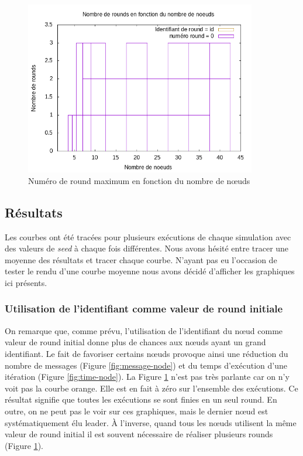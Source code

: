 \documentclass[french]{article}
\begin{document}
\begin{figure}[ht]
	\centering
	\includegraphics[width=0.9\textwidth]{NoeudsRounds.png} %
	\caption{Numéro de round maximum en fonction du nombre de nœuds}
	\label{fig:round-node}
\end{figure}

\subsection{Résultats}

Les courbes ont été tracées pour plusieurs exécutions de chaque simulation avec des valeurs de \emph{seed} à chaque fois différentes.
Nous avons hésité entre tracer une moyenne des résultats et tracer chaque courbe.
N'ayant pas eu l'occasion de tester le rendu d'une courbe moyenne nous avons décidé d'afficher les graphiques ici présents.

\subsubsection{Utilisation de l'identifiant comme valeur de round initiale}

On remarque que, comme prévu, l'utilisation de l'identifiant du nœud comme valeur de round initial donne plus de chances aux nœuds ayant un grand identifiant.
Le fait de favoriser certains nœuds provoque ainsi une réduction du nombre de messages (Figure \ref{fig:message-node}) et du temps d'exécution d'une itération (Figure \ref{fig:time-node}).
La Figure \ref{fig:round-node} n'est pas très parlante car on n'y voit pas la courbe orange. Elle est en fait à zéro sur l'ensemble des exécutions.
Ce résultat signifie que toutes les exécutions se sont finies en un seul round.
En outre, on ne peut pas le voir sur ces graphiques, mais le dernier nœud est systématiquement élu leader.
À l'inverse, quand tous les nœuds utilisent la même valeur de round initial il est souvent nécessaire de réaliser plusieurs rounds (Figure \ref{fig:round-node}).
\end{document}
